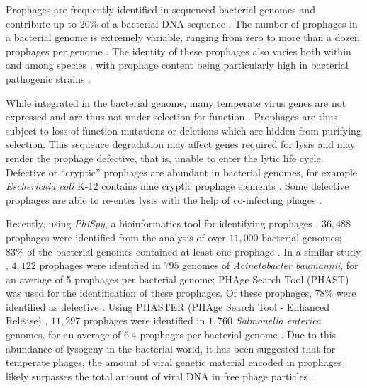 Prophages are frequently identified in sequenced bacterial genomes and contribute up to  20\%  of a bacterial DNA sequence \citep{casjens_prophages_2003}. The number of prophages in a bacterial genome is extremely variable, ranging from zero to more than a dozen prophages per genome \citep{touchon_genetic_2016}. The identity of these prophages also varies both within and among species \citep{mottawea_salmonella_2018}, with prophage content being particularly high in bacterial pathogenic strains \citep{canchaya_impact_2004}.

While integrated in the bacterial genome, many temperate virus genes are not expressed and are thus not under selection for function \citep{lawrence_where_2001}. Prophages are thus subject to loss-of-function mutations or deletions \citep{casjens_prophages_2003} which are hidden from purifying selection.  This sequence degradation may affect genes required for lysis and may render the prophage defective, that is, unable to enter the lytic life cycle.  Defective or ``cryptic'' prophages are abundant in bacterial genomes, for example  \textit{Escherichia coli} K-12 contains nine cryptic prophage elements \citep{wang_cryptic_2010}. Some defective prophages are able to re-enter lysis with the help of co-infecting phages \citep{matos_enterococcus_2013}.

Recently, using \textit{PhiSpy}, a bioinformatics tool for identifying prophages \citep{akhter_phispy:_2012}, $36,488$ prophages  were identified from the analysis of over $11,000$ bacterial genomes; $83 \%$ of the bacterial genomes contained at least one prophage \citep{kang_prophage_2017}. In a similar study \citep{costa_genomic_2018}, $4,122 $ prophages were identified in $795$ genomes of  \textit{Acinetobacter baumannii}, for an average of 5 prophages per bacterial genome; PHAge Search Tool (PHAST) \citep{zhou_phast:_2011} was used for the identification of these prophages. 
Of these prophages,  $78\%$  were identified as defective  \citep{costa_genomic_2018}. Using PHASTER (PHAge Search Tool - Enhanced Release) \citep{arndt_phaster:_2016}, $11,297$ prophages were identified in $1,760$ \textit{Salmonella enterica} genomes, for an average of $6.4$ prophages per bacterial genome \citep{mottawea_salmonella_2018}. Due to this abundance of lysogeny in the bacterial world, it has been suggested that for temperate phages, the amount of viral genetic material encoded in  prophages likely surpasses the total amount of viral DNA in free phage particles \citep{wahl_prophage_2017}. 
 
